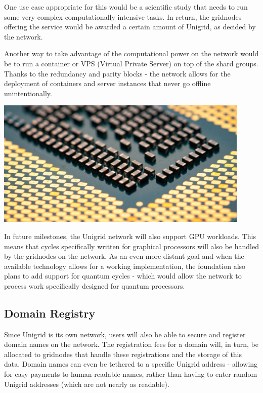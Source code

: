 \documentclass{article}
\begin{document}
One use case appropriate for this would be a scientific study that needs to run some very complex computationally intensive tasks. In return, the gridnodes offering the service would be awarded a certain amount of Unigrid, as decided by the network. 

Another way to take advantage of the computational power on the network would be to run a container or VPS (Virtual Private Server) on top of the shard groups. Thanks to the redundancy and parity blocks - the network allows for the deployment of containers and server instances that never go offline unintentionally.

\begin{mdframed}[style=textimage]
	\includegraphics[width=345pt]{compute}
\end{mdframed}

\noindent In future milestones, the Unigrid network will also support GPU workloads. This means that cycles specifically written for graphical processors will also be handled by the gridnodes on the network. As an even more distant goal and when the available technology allows for a working implementation, the foundation also plans to add support for quantum cycles - which would allow the network to process work specifically designed for quantum processors.

\subsection{Domain Registry}
Since Unigrid is its own network, users will also be able to secure and register domain names on the network. The registration fees for a domain will, in turn, be allocated to gridnodes that handle these registrations and the storage of this data. Domain names can even be tethered to a specific Unigrid address - allowing for easy payments to human-readable names, rather than having to enter random Unigrid addresses (which are not nearly as readable).
\end{document}
